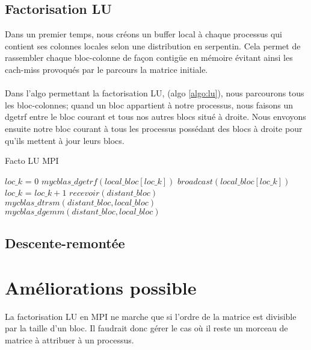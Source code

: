\documentclass{article}
\begin{document}
\subsection{Factorisation LU}
Dans un premier temps, nous créons un buffer local à chaque processus qui contient ses colonnes locales selon une distribution en serpentin. Cela permet de rassembler chaque bloc-colonne de façon contigüe en mémoire évitant ainsi les cach-miss provoqués par le parcours la matrice initiale.

\paragraph{}
Dans l'algo permettant la factorisation LU, (algo \ref{algo:lu}), nous parcourons tous les bloc-colonnes; quand un bloc appartient à notre processus, nous faisons un dgetrf entre le bloc courant et tous nos autres blocs situé à droite. Nous envoyons ensuite notre bloc courant à tous les processus possédant des blocs à droite pour qu'ils mettent à jour leurs blocs. 

\begin{algorithm}
  \caption{Facto LU MPI}\label{algo:lu}
  \begin{algorithmic}[1]
    \State $ loc\_k $ = $ 0 $
    \State $ mycblas\_dgetrf(local\_bloc[loc\_k]) $
    \State $ broadcast(local\_bloc[loc\_k]) $
    \State $ loc\_k $ = $ loc\_k + 1 $
    \Else
    \State $ recevoir(distant\_bloc) $
    \State $ mycblas\_dtrsm(distant\_bloc, local\_bloc) $
    \State $ mycblas\_dgemm(distant\_bloc, local\_bloc) $
    \EndIf
    \EndFor

  \end{algorithmic}
\end{algorithm}


\subsection{Descente-remontée}

\section{Améliorations possible}
La factorisation LU en MPI ne marche que si l'ordre de la matrice est divisible par la taille d'un bloc. Il faudrait donc gérer le cas où il reste un morceau de matrice à attribuer à un processus.
\end{document}
